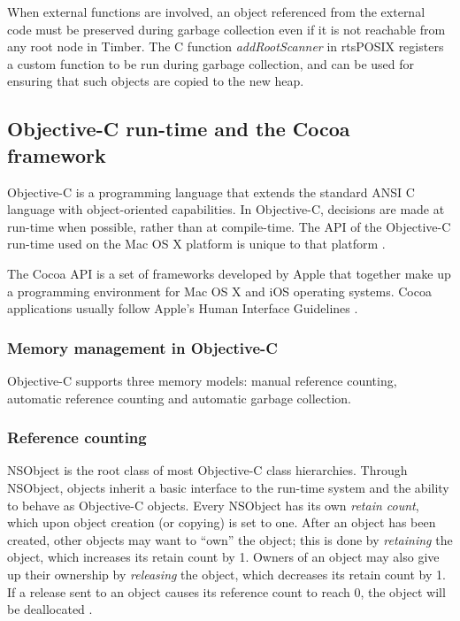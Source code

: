 \documentclass[a4paper]{article}
\begin{document}
When external functions are involved, an object referenced from the external code must be preserved during garbage collection even if it is not reachable from any root node in Timber. The C function \textit{addRootScanner} in rtsPOSIX registers a custom function to be run during garbage collection, and can be used for ensuring that such objects are copied to the new heap.

\subsection{Objective-C run-time and the Cocoa framework}
Objective-C is a programming language that extends the standard ANSI C language with object-oriented capabilities. In Objective-C, decisions are made at run-time when possible, rather than at compile-time. The API of the Objective-C run-time used on the Mac OS X platform is unique to that platform \cite{objcRuntime}.

The Cocoa API  \cite{cocoaLib}  is a set of frameworks developed by Apple that together make up a programming environment for Mac OS X and iOS operating systems. Cocoa applications usually follow Apple's Human Interface Guidelines \cite{cocoaGuidelines}.

\subsubsection*{Memory management in Objective-C}

Objective-C supports three memory models: manual reference counting, automatic reference counting and automatic garbage collection.

\subsubsection*{Reference counting}
NSObject is the root class of most Objective-C class hierarchies. Through NSObject, objects inherit a basic interface to the run-time system and the ability to behave as Objective-C objects. Every NSObject has its own \textit{retain count},  which upon object creation (or copying) is set to one. After an object has been created, other objects may want to ``own'' the object; this is done by \textit{retaining} the object, which increases its retain count by 1. Owners of an object may also give up their ownership by \textit{releasing} the object, which decreases its retain count by 1. If a release sent to an object causes its reference count to reach 0, the object will be deallocated \cite{cocoaMemory}.
\end{document}
